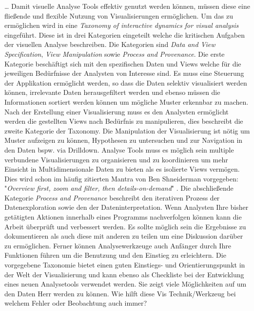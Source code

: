 \documentclass[draft=false
              ,paper=a4
              ,twoside=false
              ,fontsize=11pt
              ,headsepline
              ,BCOR10mm
              ,DIV11
              ]{scrbook}
\begin{document}
\ldots
Damit visuelle Analyse Tools effektiv genutzt werden können, müssen diese eine fließende und flexible Nutzung von Visualisierungen ermöglichen. Um das zu ermöglichen wird in \cite{heer_interactive_2012} eine \textit{Taxonomy of interactive dynamics for visual analysis} eingeführt. Diese ist in drei Kategorien eingeteilt welche die kritischen Aufgaben der visuellen Analyse beschreiben. Die Kategorien sind \textit{Data and View Specification}, \textit{View Manipulation} sowie \textit{Process and Provenance}. Die erste Kategorie beschäftigt sich mit den spezifischen Daten und Views welche für die jeweiligen Bedürfnisse der Analysten von Interesse sind. Es muss eine Steuerung der Applikation ermöglicht werden, so dass die Daten selektiv visualisiert werden können, irrelevante Daten herausgefiltert werden und ebenso müssen die Informationen sortiert werden können um mögliche Muster erkennbar zu machen. Nach der Erstellung einer Visualisierung muss es den Analysten ermöglicht werden die gestellten Views nach Bedürfnis zu manipulieren, dies beschreibt die zweite Kategorie der Taxonomy. Die Manipulation der Visualisierung ist nötig um Muster aufzeigen zu können, Hypothesen zu untersuchen und zur Navigation in den Daten bspw. via Drilldown. Analyse Tools muss es möglich sein multiple verbundene Visualisierungen zu organisieren und zu koordinieren um mehr Einsicht in Multidimensionale Daten zu bieten als es isolierte Views vermögen. Dies wird schon im häufig zitierten Mantra von Ben Shneiderman vorgegeben: "\textit{Overview first, zoom and filter, then details-on-demand}" \cite{shneiderman_the_eyes_1996}. Die abschließende Kategorie \textit{Process and Provenance} beschreibt den iterativen Prozess der Datenexploration sowie den der Dateninterpretation. Wenn Analysten Ihre bisher getätigten Aktionen innerhalb eines Programms nachverfolgen können kann die Arbeit überprüft und verbessert werden. Es sollte möglich sein die Ergebnisse zu dokumentieren als auch diese mit anderen zu teilen um eine Diskussion darüber zu ermöglichen. Ferner können Analysewerkzeuge auch Anfänger durch Ihre Funktionen führen um die Benutzung und den Einstieg zu erleichtern.
Die vorgegebene Taxonomie bietet einen guten Einstiegs- und Orientierungspunkt in der Welt der Visualisierung und kann ebenso als Checkliste bei der Entwicklung eines neuen Analysetools verwendet werden. Sie zeigt viele Möglichkeiten auf um den Daten Herr werden zu können. 
\iffalse %
Wie hilft diese Vis Technik/Werkzeug bei welchem Fehler oder Beobachtung auch immer?
\end{document}
